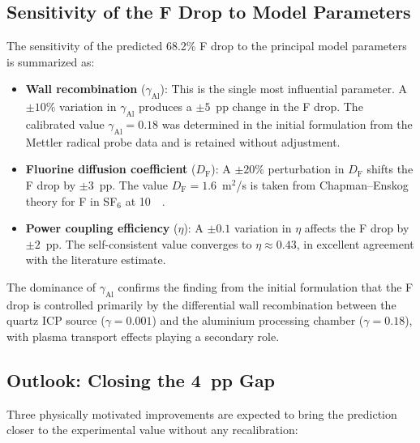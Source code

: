 \documentclass[11pt,a4paper]{report}
\begin{document}
\subsection{Sensitivity of the F Drop to Model Parameters}

The sensitivity of the predicted 68.2\% F drop to the principal model parameters is summarized as:
\begin{itemize}
  \item \textbf{Wall recombination} ($\gamma_\mathrm{Al}$): This is the single most influential parameter.  A $\pm 10\%$ variation in $\gamma_\mathrm{Al}$ produces a $\pm 5$~pp change in the F drop.  The calibrated value $\gamma_\mathrm{Al} = 0.18$ was determined in the initial formulation from the Mettler radical probe data and is retained without adjustment.
  \item \textbf{Fluorine diffusion coefficient} ($D_\mathrm{F}$): A $\pm 20\%$ perturbation in $D_\mathrm{F}$ shifts the F drop by $\pm 3$~pp.  The value $D_\mathrm{F} = 1.6$~m$^2$/s is taken from Chapman--Enskog theory for F in SF$_6$ at \SI{10}{\milli\torr}.
  \item \textbf{Power coupling efficiency} ($\eta$): A $\pm 0.1$ variation in $\eta$ affects the F drop by $\pm 2$~pp.  The self-consistent value converges to $\eta \approx 0.43$, in excellent agreement with the literature estimate.
\end{itemize}

The dominance of $\gamma_\mathrm{Al}$ confirms the finding from the initial formulation that the F drop is controlled primarily by the differential wall recombination between the quartz ICP source ($\gamma = 0.001$) and the aluminium processing chamber ($\gamma = 0.18$), with plasma transport effects playing a secondary role.

\subsection{Outlook: Closing the 4~pp Gap}

Three physically motivated improvements are expected to bring the prediction closer to the experimental value without any recalibration:
\end{document}
